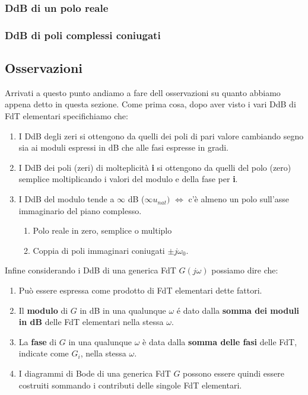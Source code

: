 \documentclass[../main.tex]{subfiles}
\begin{document}
\subsubsection{DdB di un polo reale}
\subsubsection{DdB di poli complessi coniugati}

\subsection{Osservazioni}

Arrivati a questo punto andiamo a fare dell osservazioni su quanto abbiamo appena detto in questa sezione.
Come prima cosa, dopo aver visto i vari DdB di FdT elementari specifichiamo che:


\begin{enumerate}
	\item[\textbf{-}] I DdB degli zeri si ottengono da quelli dei poli di pari valore cambiando segno sia ai moduli espressi in dB che alle fasi espresse in gradi.
	
	\item[\textbf{-}] I DdB dei poli (zeri) di molteplicità \textbf{i} si ottengono da quelli del polo (zero) semplice moltiplicando i valori del modulo e della fase per \textbf{i}.
	
	
	\item[\textbf{-}] I DdB del modulo tende a $\infty$ dB ($\infty \unit{u_{nat}})$ $\Leftrightarrow$ c'è almeno un polo sull'asse immaginario del piano complesso.
		\begin{enumerate}
			\item[\textbf{-}] Polo reale in zero, semplice o multiplo 
			\item[\textbf{-}] Coppia di poli immaginari coniugati $\pm j\omega_0$.  
		\end{enumerate}
	
\end{enumerate}

Infine considerando i DdB di una generica FdT $G(j\omega)$ possiamo dire che:

\begin{enumerate}
	\item[\textbf{-}] Può essere espressa come prodotto di FdT elementari dette fattori.
	
	\item[\textbf{-}] Il \textbf{modulo} di $G$ in dB in una qualunque $\omega$ é dato dalla \textbf{somma dei moduli in dB} delle FdT elementari nella stessa $\omega$.
	
	\item[\textbf{-}] La \textbf{fase} di $G$ in una qualunque $\omega$ è data dalla \textbf{somma delle fasi} delle FdT, indicate come $G_i$, nella stessa $\omega$.
	
	\item[\textbf{-}] I diagrammi di Bode di una generica FdT $G$ possono essere quindi essere costruiti sommando i contributi delle singole FdT elementari.
	
\end{enumerate}
\end{document}
